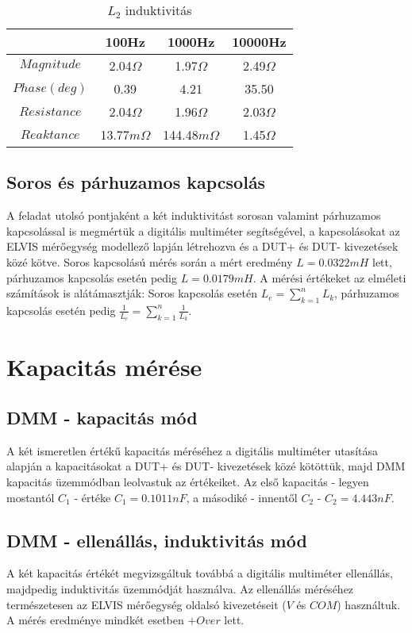 \documentclass[10pt, conference,a4paper]{ITKproc}
\begin{document}
\begin{table}[!t]
\renewcommand{\arraystretch}{1.3}
\caption{$L_2$ induktivitás}
\centering
\begin{tabular}{c||c||c||c}
\hline
\bfseries & \bfseries 100Hz & \bfseries 1000Hz & \bfseries 10000Hz\\
\hline\hline
$Magnitude$ & 2.04$\Omega$ & 1.97$\Omega$  & 2.49$\Omega$\\
\hline
$Phase(deg)$ & 0.39 & 4.21  & 35.50\\
\hline
$Resistance$ & 2.04$\Omega$ & 1.96$\Omega$  & 2.03$\Omega$\\
\hline
$Reaktance$ & 13.77$m\Omega$ & 144.48$m\Omega$  & 1.45$\Omega$\\
\hline
\end{tabular}
\end{table}

\subsection{Soros és párhuzamos kapcsolás}
A feladat utolsó pontjaként a két induktivitást sorosan valamint párhuzamos kapcsolással is megmértük a digitális multiméter segítségével, a kapcsolásokat az ELVIS mérőegység modellező lapján létrehozva és a DUT+ és DUT- kivezetések közé kötve. Soros kapcsolású mérés során a mért eredmény $L = 0.0322 mH$ lett, párhuzamos kapcsolás esetén pedig $L = 0.0179 mH$. A mérési értékeket az elméleti számítások is alátámasztják: Soros kapcsolás esetén $L_e = \sum_{k=1}^{n} L_k$, párhuzamos kapcsolás esetén pedig $\frac{1}{L_e} = \sum_{k=1}^{n} \frac{1}{L_k}$. 

\section{Kapacitás mérése}
\subsection{DMM - kapacitás mód}
A két ismeretlen értékű kapacitás méréséhez a digitális multiméter utasítása alapján a kapacitásokat a DUT+ és DUT- kivezetések közé kötöttük, majd DMM kapacitás üzemmódban leolvastuk az értékeiket. Az első kapacitás - legyen mostantól $C_1$ - értéke $C_1 = 0.1011 nF$, a másodiké - innentől $C_2$ - $C_2 = 4.443 nF$. 
\subsection{DMM - ellenállás, induktivitás mód}
A két kapacitás értékét megvizsgáltuk továbbá a digitális multiméter ellenállás, majdpedig induktivitás üzemmódját használva. Az ellenállás méréséhez természetesen az ELVIS mérőegység oldalsó kivezetéseit ($V$ és $COM$) használtuk. A mérés eredménye mindkét esetben $+Over$ lett. 
\end{document}
